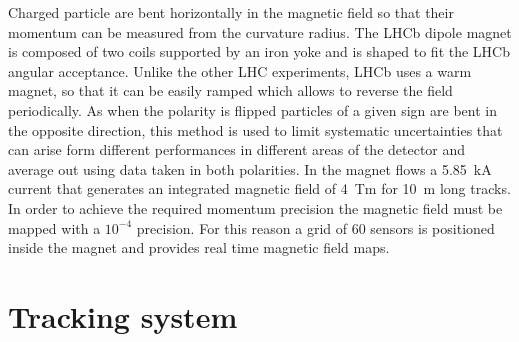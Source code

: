 Charged particle are bent horizontally in the magnetic field
so that their momentum can be measured from the curvature radius.
The LHCb dipole magnet is composed of two coils supported by an iron yoke
and is shaped to fit the LHCb angular acceptance. Unlike the other LHC experiments,
LHCb uses a warm magnet, so that it can be easily ramped which allows to reverse the field periodically.
As when the polarity is flipped particles of a given sign are bent in the opposite direction,
this method is used to limit systematic uncertainties that can arise form different performances
in different areas of the detector and average out using data taken in both polarities.
In the magnet flows a 5.85~kA current that generates an integrated magnetic field of 4~Tm for 10~m long tracks.
In order to achieve the required momentum precision the magnetic field must be mapped with
a $10^{-4}$ precision. For this reason a grid of 60 sensors is positioned inside the magnet
and provides real time magnetic field maps.

\section{Tracking system}
\label{sec:tracking}

